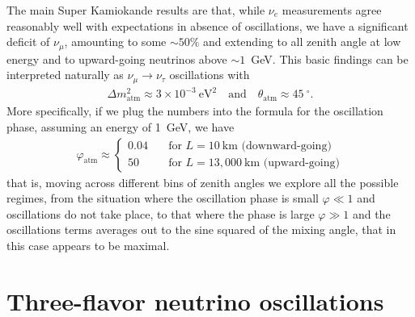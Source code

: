 The main Super Kamiokande results are that, while $\nu_e$ measurements agree reasonably
well with expectations in absence of oscillations, we have a significant deficit of
$\nu_\mu$, amounting to some $\sim 50\%$ and extending to all zenith angle at low
energy and to upward-going neutrinos above $\sim 1$~GeV. This basic findings can be
interpreted naturally as $\nu_\mu \rightarrow \nu_\tau$ oscillations with
\begin{align}
  \Delta m^2_\text{atm} \approx 3 \times 10^{-3}~\text{eV}^2
  \quad\text{and}\quad
  \theta_\text{atm} \approx 45~^\circ.
\end{align}
More specifically, if we plug the numbers into the formula for the oscillation phase,
assuming an energy of 1~GeV, we have
\begin{align*}
  \varphi_\text{atm} \approx \begin{cases}
  0.04 & \quad\text{for } L = 10~\text{km (downward-going)}\\
  50   & \quad\text{for } L = 13,000~\text{km (upward-going)}
\end{cases}
\end{align*}
that is, moving across different bins of zenith angles we explore all the possible
regimes, from the situation where the oscillation phase is small $\varphi \ll 1$
and oscillations do not take place, to that where the phase is large $\varphi \gg 1$
and the oscillations terms averages out to the sine squared of the mixing angle,
that in this case appears to be maximal.


\section{Three-flavor neutrino oscillations}
\label{sec:nu_oscillation_3nu}

